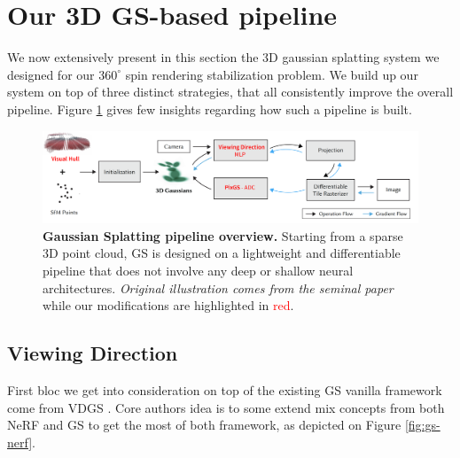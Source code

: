 \section{Our 3D GS-based pipeline}
We now extensively present in this section the 3D gaussian splatting system we designed for our $360^{\circ}$ spin rendering stabilization problem. We build up our system on top of three distinct strategies, that all consistently improve the overall pipeline. Figure \ref{fig:gs-overview} gives few insights regarding how such a pipeline is built. \newline

\begin{figure}[htb!]
    \center
  \includegraphics[width=\linewidth]{images/gaussiansplatting/overview_pipeline.png}
  \caption{\textbf{Gaussian Splatting pipeline overview.} Starting from a sparse 3D point cloud, GS is designed on a lightweight and differentiable pipeline that does not involve any deep or shallow neural architectures. \textit{Original illustration comes from the seminal paper}\citep{kerbl20233d} while our modifications are highlighted in \textcolor{red}{red}.}
  \label{fig:gs-overview}
\end{figure}

\subsection{Viewing Direction}
First bloc we get into consideration on top of the existing GS vanilla framework come from \ac{VDGS} \citep{malarz2023gaussian}. Core authors idea is to some extend mix concepts from both NeRF and GS to get the most of both framework, as depicted on Figure \ref{fig:gs-nerf}. 

